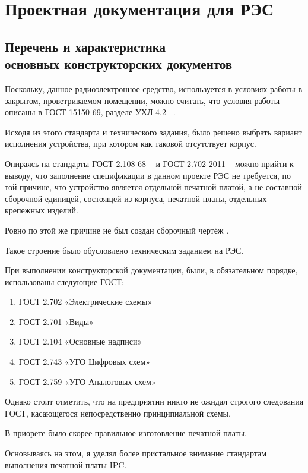 \section{Проектная документация для РЭС}

\subsection{Перечень и характеристика\\
  основных конструкторских документов}

Поскольку,
данное радиоэлектронное средство,
используется в условиях работы в закрытом, проветриваемом помещении,
можно считать, что условия работы описаны в ГОСТ-15150-69,
разделе УХЛ 4.2 ~\cite{GOST-15150-69}.

Исходя из этого стандарта и технического задания,
было решено выбрать вариант исполнения устройства,
при котором как таковой отсутствует корпус.

Опираясь на стандарты ГОСТ 2.108-68 ~\cite{GOST-spec}
и ГОСТ 2.702-2011 ~\cite{GOST-2-702-2011} можно прийти к выводу,
что заполнение спецификации в данном проекте РЭС не требуется,
по той причине, что устройство является отдельной печатной платой,
а не составной сборочной единицей,
состоящей из корпуса, печатной платы,
отдельных крепежных изделий.

Ровно по этой же причине не был создан сборочный чертёж .

Такое строение было обусловлено техническим заданием на РЭС.

При выполнении конструкторской документации,
были, в обязательном порядке, использованы следующие ГОСТ:
\begin{enumerate}
\item ГОСТ 2.702 «Электрические схемы»  
\item ГОСТ 2.701 «Виды»                 
\item ГОСТ 2.104 «Основные надписи»     
\item ГОСТ 2.743 «УГО Цифровых схем»    
\item ГОСТ 2.759 «УГО Аналоговых схем»  
\end{enumerate}

Однако стоит отметить, что на предприятии никто не ожидал
строгого следования ГОСТ, касающегося непосредственно
принципиальной схемы.

В приорете было скорее правильное изготовление печатной платы.

Основываясь на этом,
я уделял более пристальное внимание стандартам выполнения печатной платы IPC.

